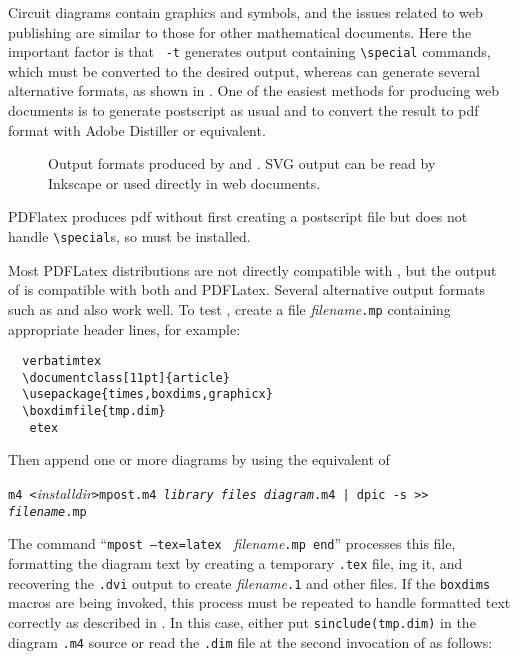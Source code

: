 
Circuit diagrams contain graphics and symbols, and the issues related to
web publishing are similar to those for other mathematical documents.
Here the important factor is that \gpic\ {\tt -t} generates output
containing \tpic \verb|\special| commands, which must be converted
to the desired output, whereas \dpic can generate several alternative
formats, as shown in .
One of the easiest methods
for producing web documents is to generate postscript as usual and to
convert the result to pdf format with Adobe Distiller or equivalent.
\begin{figure}[h!b]
   
   \caption{Output formats produced by  and \dpic.
      SVG output can be read by Inkscape or used directly in web documents.}
   \label{Workflow}
   \end{figure}

PDFlatex produces pdf without first creating a postscript file
but does not handle \tpic \verb|\special|s, so \dpic must be
installed.

Most PDFLatex distributions are not directly compatible with \PSTricks, but
the \TPGF output of \dpic is compatible with both \latex and PDFLatex.
Several alternative \dpic output formats such as
\mfpic and \MetaPost also work well.
To test \MetaPost, create a file {\sl filename}{\tt .mp}
containing appropriate header lines, for example:
\begin{verbatim}
  verbatimtex
  \documentclass[11pt]{article}
  \usepackage{times,boxdims,graphicx}
  \boxdimfile{tmp.dim}
   etex
\end{verbatim}
Then append one or more diagrams by using the equivalent of

{\tt m4 <}{\sl installdir}{\tt >mpost.m4 {\sl library files}
  {\sl diagram}.m4 | dpic -s >> {\sl filename}.mp}

The command ``{\tt mpost --tex=latex } {\sl filename}{\tt .mp end}''
processes this file, formatting the diagram text by creating a
temporary {\tt .tex} file, \latex{}ing it, and recovering the {\tt .dvi}
output to create {\sl filename}{\tt .1} and other files.  If the {\tt boxdims}
macros are being invoked, this process must be repeated to handle
formatted text correctly as described in .
In this case, either put {\tt sinclude(tmp.dim)} in the diagram {\tt .m4}
source or read the {\tt .dim} file at the second invocation of
\Mfour as follows:

